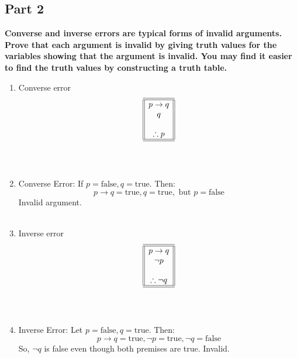 \documentclass{amsart}
\theoremstyle{definition}
\theoremstyle{Exercise}
\theoremstyle{remark}
\theoremstyle{rule}
\numberwithin{equation}{section}
\begin{document}
\subsection*{Part 2}
{\bf Converse and inverse errors are typical forms of invalid arguments. Prove that each argument is invalid by giving truth values for the variables showing that the argument is invalid. You may find it easier to find the truth values by constructing a truth table.}\\
 \begin{enumerate}[label=(\alph*)]
\item Converse error
\[
\begin{array}{||c||}
\hline \hline
p \to q\\
q\\
\\
\therefore p\\
\hline \hline
\end{array}
\]\\\\
\item Converse Error:
If \( p = \text{false}, q = \text{true} \). Then:
\[
p \to q = \text{true}, q = \text{true}, \text{ but } p = \text{false}
\]
Invalid argument.
 \\\\
\item Inverse error
\[
\begin{array}{||c||}
\hline \hline
p \to q\\
\neg p\\
\\
\therefore \neg q\\
\hline \hline
\end{array}
\]\\\\
\item Inverse Error:
Let \( p = \text{false}, q = \text{true} \). Then:
\[
p \to q = \text{true}, \neg p = \text{true}, \neg q = \text{false}
\]
So, \(\neg q\) is false even though both premises are true. Invalid.
\\\\
\end{enumerate}
\end{document}
